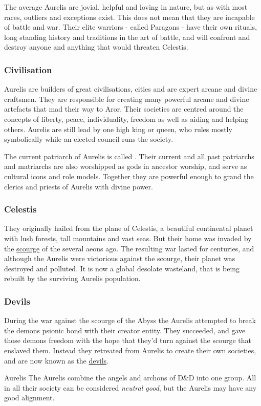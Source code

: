 The average Aurelis are jovial, helpful and loving in nature, but as with most
races, outliers and exceptions exist. This does not mean that they are
incapable of battle and war. Their elite warriors - called Paragons - have
their own rituals, long standing history and traditions in the art of battle,
and will confront and destroy anyone and anything that would threaten
Celestis.

\subsubsection{Civilisation}

Aurelis are builders of great civilisations, cities and are expert arcane and
divine craftsmen. They are responsible for creating many powerful arcane and
divine artefacts that mad their way to Aror. Their societies are centred
around the concepts of liberty, peace, individuality, freedom as well as
aiding and helping others. Aurelis are still lead by one high king or queen,
who rules mostly symbolically while an elected council runs the society.

The current patriarch of Aurelis is called . Their current
and all past patriarchs and matriarchs are also worshipped as gods in ancestor
worship, and serve as cultural icons and role models. Together they are
powerful enough to grand the clerics and priests of Aurelis with divine power.

\subsubsection{Celestis}
\label{sec:Celestis}

They originally hailed from the plane of Celestis, a beautiful continental
planet with lush forests, tall mountains and vast seas. But their home was
invaded by the \hyperref[sec:Scourge]{scourge} of the 
several aeons ago. The resulting war lasted for centuries, and although the
Aurelis were victorious against the scourge, their planet was destroyed and
polluted. It is now a global desolate wasteland, that is being rebuilt by the
surviving Aurelis population.

\subsubsection{Devils}

During the war against the scourge of the Abyss the Aurelis attempted to break
the demons psionic bond with their creator entity. They succeeded, and gave
those demons freedom with the hope that they'd turn against the scourge that
enslaved them. Instead they retreated from Aurelis to create their own
societies, and are now known as the \hyperref[sec:Devils]{devils}.

\begin{35e}{Aurelis}
  The Aurelis combine the angels and archons of D\&D into one group. All in all
  their society can be considered \emph{neutral good}, but the Aurelis may have
  any good alignment.
\end{35e}

